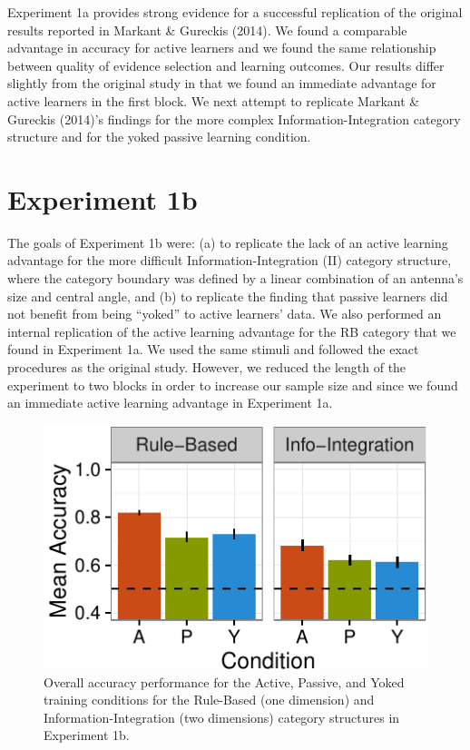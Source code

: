 \documentclass[10pt, letterpaper]{article}
\newenvironment{CodeChunk}{}{}
\begin{document}
Experiment 1a provides strong evidence for a successful replication of
the original results reported in Markant \& Gureckis (2014). We found a
comparable advantage in accuracy for active learners and we found the
same relationship between quality of evidence selection and learning
outcomes. Our results differ slightly from the original study in that we
found an immediate advantage for active learners in the first block. We
next attempt to replicate Markant \& Gureckis (2014)'s findings for the
more complex Information-Integration category structure and for the
yoked passive learning condition.

\section{Experiment 1b}\label{experiment-1b}

The goals of Experiment 1b were: (a) to replicate the lack of an active
learning advantage for the more difficult Information-Integration (II)
category structure, where the category boundary was defined by a linear
combination of an antenna's size and central angle, and (b) to replicate
the finding that passive learners did not benefit from being ``yoked''
to active learners' data. We also performed an internal replication of
the active learning advantage for the RB category that we found in
Experiment 1a. We used the same stimuli and followed the exact
procedures as the original study. However, we reduced the length of the
experiment to two blocks in order to increase our sample size and since
we found an immediate active learning advantage in Experiment 1a.

\begin{CodeChunk}
\begin{figure}[t]

\includegraphics{figs/rep1b-acc-plot-1} \hfill{}

\caption[Overall accuracy performance for the Active, Passive, and Yoked training conditions for the Rule-Based (one dimension) and Information-Integration (two dimensions) category structures in Experiment 1b]{Overall accuracy performance for the Active, Passive, and Yoked training conditions for the Rule-Based (one dimension) and Information-Integration (two dimensions) category structures in Experiment 1b.}\label{fig:rep1b-acc-plot}
\end{figure}
\end{CodeChunk}
\end{document}
